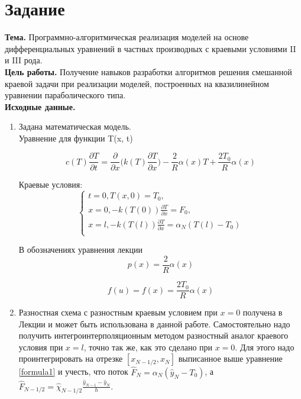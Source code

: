\chapter*{Задание}

\textbf{Тема. } Программно-алгоритмическая реализация моделей на основе дифференциальных уравнений в частных производных с краевыми условиями II и III рода.\\

\textbf{Цель работы. } Получение навыков разработки алгоритмов решения смешанной краевой
задачи при реализации моделей, построенных на квазилинейном уравнении
параболического типа. \\

\textbf{Исходные данные. }\\
\begin{enumerate}
	\item Задана математическая модель. \\
	Уравнение для функции T(x, t)
	
	\begin{equation}\label{formula1}
		c(T)\frac{\partial T}{\partial t} = \frac{\partial}{\partial x}\big(k(T)\frac{\partial T}{\partial x}\big) - \frac{2}{R}\alpha(x)T + \frac{2T_0}{R}\alpha(x)
	\end{equation}

	Краевые условия:
	\begin{equation}\label{formula2}
		\left\{
		\begin{array}{ccc}
			t = 0, T(x,0) = T_0,\\
			x = 0, -k(T(0))\frac{\partial T}{\partial x} = F_0, \\
			x = l, -k(T(l))\frac{\partial T}{\partial x} = \alpha_N(T(l) - T_0) \\
		\end{array}
		\right.
	\end{equation}

	В обозначениях уравнения лекции
	\begin{equation}\label{formula3}
		p(x) = \frac{2}{R}\alpha(x)
	\end{equation}

	\begin{equation}\label{formula4}
		f(u) = f(x) = \frac{2T_0}{R}\alpha(x)
	\end{equation}

	\item Разностная схема с разностным краевым условием при $x = 0$ получена в Лекции и может быть использована в данной работе. Самостоятельно надо получить интегроинтерполяционным  методом разностный аналог краевого условия при $x = l$, точно так же, как это сделано при $x = 0$. Для этого надо проинтегрировать на отрезке $[x_{N-1/2}, x_N]$ выписанное выше уравнение \ref{formula1} и учесть, что поток $\hat{F}_N = \alpha_N(\hat{y}_N - T_0)$, а $\hat{F}_{N-1/2} = \hat{\chi}_{N-1/2}\frac{\hat{y}_{N-1} - \hat{y}_N}{h}$.


\end{enumerate}
